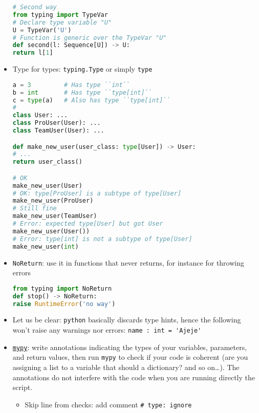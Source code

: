 \documentclass[a4paper,12pt,%
              final%
              ]{article}
\begin{document}
\begin{itemize}
\begin{lstlisting}[language=python]
# Second way
from typing import TypeVar
# Declare type variable "U"
U = TypeVar('U')
# Function is generic over the TypeVar "U"
def second(l: Sequence[U]) -> U:
return l[1]
\end{lstlisting}
  \item Type for types: \verb|typing.Type| or simply \verb|type|
\begin{lstlisting}[language=python]
a = 3         # Has type ``int``
b = int       # Has type ``type[int]``
c = type(a)   # Also has type ``type[int]``
#
class User: ...
class ProUser(User): ...
class TeamUser(User): ...

def make_new_user(user_class: type[User]) -> User:
# ...
return user_class()

# OK
make_new_user(User)
# OK: type[ProUser] is a subtype of type[User]
make_new_user(ProUser)
# Still fine
make_new_user(TeamUser)
# Error: expected type[User] but got User
make_new_user(User())
# Error: type[int] is not a subtype of type[User]
make_new_user(int)
\end{lstlisting}
  \item \texttt{NoReturn}: use it in functions that never returns, for instance for throwing errors
\begin{lstlisting}[language=python]
from typing import NoReturn
def stop() -> NoReturn:
raise RuntimeError('no way')
\end{lstlisting}
  \item Let us be clear: \texttt{python} basically discards type hints, hence the following won't raise any warnings nor errors: \verb|name : int = 'Ajeje'|
  \item \href{https://mypy.readthedocs.io/en/stable/index.html}{\texttt{mypy}}: write annotations indicating the types of your variables, parameters, and return values, then run \texttt{mypy} to check if your code is coherent (are you assigning a list to a variable that should a dictionary? and so on\ldots). The annotations do not interfere with the code when you are running directly the script.
    \begin{itemize}
      \item Skip line from checks: add comment \verb|# type: ignore|
    \end{itemize}
\end{itemize}
\end{document}
